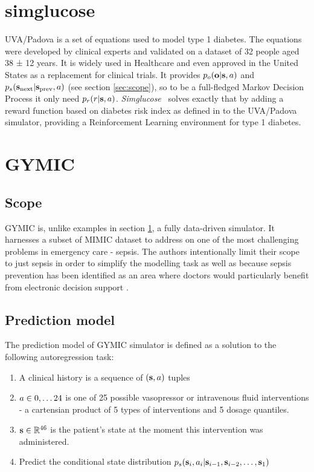 \section{simglucose}
\label{sec:simglucose}

UVA/Padova \cite{manUVAPADOVAType2014} is a set of equations used to model type 1 diabetes.
The equations were developed by clinical experts and validated on a dataset of 32 people aged 38 ± 12 years.
It is widely used in Healthcare and even approved in the United States as a replacement for clinical trials.
It provides $p_o(\mathbf{o} | \textbf{s}, a)$ and $p_s(\textbf{s}_\text{next} | \textbf{s}_\text{prev}, a)$ (see section \ref{sec:scope}), so to be a full-fledged Markov Decision Process it only need $p_r(r|\textbf{s},a)$.
\emph{Simglucose}~\cite{xieSimglucoseV0212018} solves exactly that by adding a reward function based on diabetes risk index as defined in \cite{clarkeStatisticalToolsAnalyze2009} to the UVA/Padova simulator, providing a Reinforcement Learning environment for type 1 diabetes.

\newpage
\section{GYMIC}
\label{sec:gymic}

\subsection{Scope}
GYMIC \cite{kianiGYMICOpenAIGym} is, unlike examples in section \ref{sec:simglucose}, a fully data-driven simulator.
It harnesses a subset of MIMIC \cite{johnsonMIMICIVFreelyAccessible2023} dataset to address on one of the most challenging problems in emergency care - sepsis.
The authors intentionally limit their scope to just sepsis in order to simplify the modelling task as well as because sepsis prevention has been identified as an area where doctors would particularly benefit from electronic decision support \cite{raghuDeepReinforcementLearning2017,walonoskiDeepReinforcementLearning2018}.

\subsection{Prediction model}
The prediction model of GYMIC simulator is defined as a solution to the following autoregression task:
\begin{enumerate}
    \item A clinical history is a sequence of $(\textbf{s}, a)$ tuples
    \item $a \in 0,\dots 24$ is one of 25 possible vasopressor or intravenous fluid interventions - a cartensian product of 5 types of interventions and 5 dosage quantiles.
    \item $\textbf{s} \in \mathbb{R}^{46}$ is the patient's state at the moment this intervention was administered.
    \item Predict the conditional state distribution $p_s(\textbf{s}_i, a_i | \textbf{s}_{i-1},\textbf{s}_{i-2},\dots,\textbf{s}_1)$
\end{enumerate}

